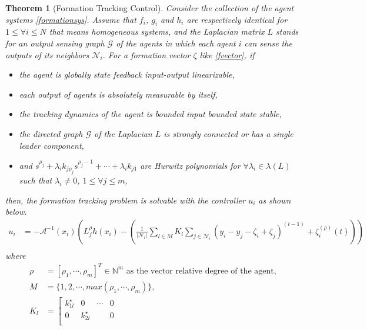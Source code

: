 \documentclass[11pt, a4paper, oneside, openany, reqno]{book}
\newtheorem{theorem}{Theorem}[chapter]
\theoremstyle{definition}
\theoremstyle{remark}
\numberwithin{equation}{chapter} %
\newcommand{\N}{\ensuremath{{\mathbb N}}}
\newcommand{\A}{\mathcal{A}}
\newcommand{\NBR}{\mathcal{N}}
\newcommand{\GRP}{\mathcal{G}}
\begin{document}
\begin{theorem}[Formation Tracking Control]\label{formationcontrolthm}
	Consider the collection of the agent systems \eqref{formationsys}. 	
	Assume that $ f_i $, $ g_i $ and $ h_i $ are respectively identical 
	for $ 1 \leq \forall i \leq N $	that means homogeneous systems,
	and	the Laplacian matrix $ L $ stands for an output sensing graph $ \GRP $ of the agents
	in which each agent $ i $ can sense the outputs of its neighbors $ \NBR_i $.
	For a formation vector $ \zeta $ like \eqref{fvector},
	if \begin{itemize}
		\item 	the agent is globally state feedback input-output linearizable,
		\item	each output of agents is absolutely measurable by itself, 		
		\item	the tracking dynamics of the agent is bounded input bounded state stable,
		\item	the directed graph $ \GRP $ of the Laplacian $ L $ is 
				strongly connected or has a single leader component,
		\item	and $ s^{\rho_j} + \lambda_i k_{j\rho_j} s^{\rho_j-1} + \cdots + \lambda_i k_{j1} $ 
				are Hurwitz polynomials for $ \forall \lambda_i \in \lambda(L) $ 
				such that $ \lambda_i \neq 0 $, $ 1 \leq \forall j \leq m $,
	\end{itemize}
	then, the formation tracking problem is solvable with the controller $ u_i $ as shown below.
	\begin{equation}\begin{split}
		u_i &= -\A^{-1}(x_i) \left( L_f^\rho h(x_i)			
		    - \left( \frac{1}{\vert \NBR_i \vert} \sum_{l \in M}
				K_{l}  \sum_{j \in \NBR_i } (y_i - y_j -  \zeta_{i} + \zeta_{j}) ^{(l-1)}  
				+  \zeta_{i}^{(\rho)}(t) \right)\right)\\			
	\end{split}\end{equation} 	
	where
	\begin{equation}\begin{split}\label{trackingthmwhere}
		\rho &=\left[ \rho_1,\cdots,\rho_m \right]^T \in \N^{m} 
		\text{ as the vector relative degree of the agent},\\
		M &= \lbrace 1,2,\cdots, max(\rho_1,\cdots,\rho_m) \rbrace, \\		
		K_l &= \left[  \begin{array}{cccc } 
		k_{1l}^\star & 0 & \cdots & 0 \\
		0 & k_{2l}^\star & & 0 \\

\end{array}
\end{split}
\end{equation}
\end{theorem}
\end{document}
